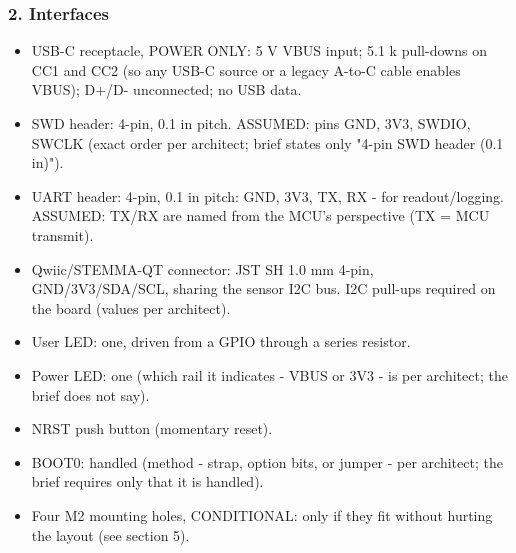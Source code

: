 \documentclass[11pt,a4paper]{article}
\begin{document}
\subsubsection*{2. Interfaces}
\begin{itemize}
\item USB-C receptacle, POWER ONLY: 5 V VBUS input; 5.1 k pull-downs on CC1 and
CC2 (so any USB-C source or a legacy A-to-C cable enables VBUS); D+/D-
unconnected; no USB data.
\item SWD header: 4-pin, 0.1 in pitch. ASSUMED: pins GND, 3V3, SWDIO, SWCLK
(exact order per architect; brief states only "4-pin SWD header (0.1 in)").
\item UART header: 4-pin, 0.1 in pitch: GND, 3V3, TX, RX - for readout/logging.
ASSUMED: TX/RX are named from the MCU's perspective (TX = MCU transmit).
\item Qwiic/STEMMA-QT connector: JST SH 1.0 mm 4-pin, GND/3V3/SDA/SCL, sharing
the sensor I2C bus. I2C pull-ups required on the board (values per
architect).
\item User LED: one, driven from a GPIO through a series resistor.
\item Power LED: one (which rail it indicates - VBUS or 3V3 - is per architect;
the brief does not say).
\item NRST push button (momentary reset).
\item BOOT0: handled (method - strap, option bits, or jumper - per architect; the
brief requires only that it is handled).
\item Four M2 mounting holes, CONDITIONAL: only if they fit without hurting the
layout (see section 5).
\end{itemize}
\end{document}
